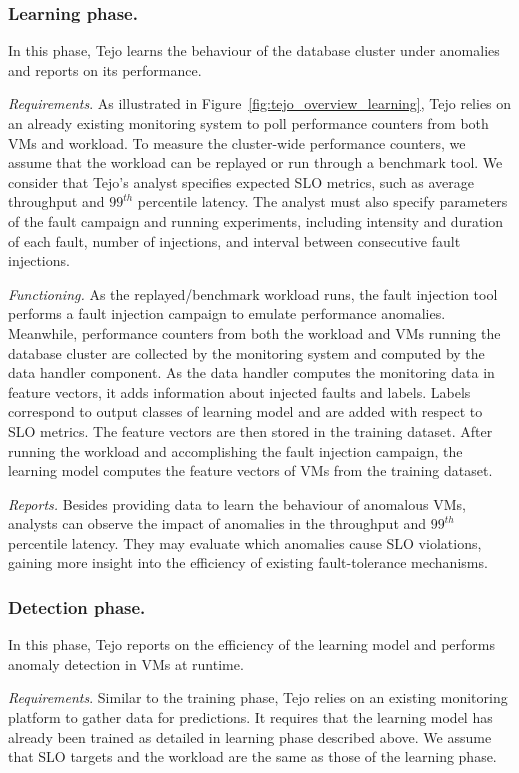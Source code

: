 \subsubsection{Learning phase.} In this phase, Tejo learns the behaviour of the database cluster under anomalies and reports on its performance.

\emph{Requirements}. As illustrated in Figure~\ref{fig:tejo_overview_learning}, Tejo relies on an already existing monitoring system to poll performance counters from both VMs and workload. To measure the cluster-wide performance counters, we assume that the workload can be replayed or run through a benchmark tool. We consider that Tejo's analyst specifies expected SLO metrics, such as average throughput and $99^{th}$ percentile latency. The analyst must also specify parameters of the fault campaign and running experiments, including intensity and duration of each fault, number of injections, and interval between consecutive fault injections. 

\emph{Functioning.} As the replayed/benchmark workload runs, the fault injection tool performs a fault injection campaign to emulate performance anomalies. Meanwhile, performance counters from both the workload and VMs running the database cluster are collected by the monitoring system and computed by the data handler component. As the data handler computes the monitoring data in feature vectors, it adds information about injected faults and labels. Labels correspond to output classes of learning model and are added with respect to SLO metrics. The feature vectors are then stored in the training dataset. After running the workload and accomplishing the fault injection campaign, the learning model computes the feature vectors of VMs from the training dataset.

\emph{Reports.} Besides providing data to learn the behaviour of anomalous VMs, analysts can observe the impact of anomalies in the throughput and $99^{th}$ percentile latency. They may evaluate which anomalies cause SLO  violations, gaining more insight into the efficiency of existing fault-tolerance mechanisms. 

\subsubsection{Detection phase.} In this phase, Tejo reports on the efficiency of the learning model and performs anomaly detection in VMs at runtime. 

\emph{Requirements}. Similar to the training phase, Tejo relies on an existing monitoring platform to gather data for predictions. It requires that the learning model has already been trained as detailed in learning phase described above. We assume that SLO targets and the workload are the same as those of the learning phase. 

